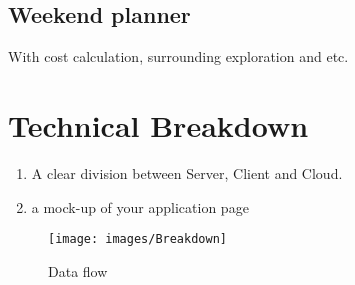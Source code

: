\documentclass[12pt]{article}
\numberwithin{equation}{section} %
\numberwithin{figure}{section} %
\numberwithin{table}{section} %
\begin{document}
	\subsection{Weekend planner}
	With cost calculation, surrounding exploration and etc.
\newpage
\section{Technical Breakdown}	
	\begin{enumerate}
		\item A clear division between Server, Client and Cloud.
		\item  a mock-up of your application page		
	\end{enumerate} 
	
	\begin{figure}[H]
		\centering		
		\texttt{[image: images/Breakdown]}
		\caption{Data flow}
	\end{figure}
	
\end{document}
